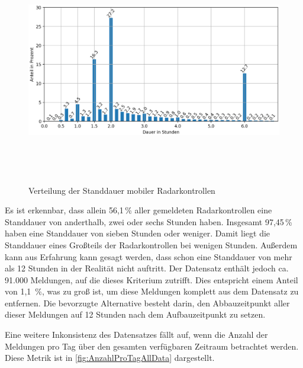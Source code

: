 \begin{figure}[h]
    \centering
    \includegraphics[width=1.0\textwidth,height=10cm,keepaspectratio=true]{content/images/Standdauer.png}
    \caption{Verteilung der Standdauer mobiler Radarkontrollen}
    \label{fig:StanddauerVerteilung}
\end{figure}

Es ist erkennbar, dass allein 56,1\,\% aller gemeldeten Radarkontrollen eine Standdauer von anderthalb, zwei oder sechs Stunden haben.
Insgesamt 97,45\,\% haben eine Standdauer von sieben Stunden oder weniger.
Damit liegt die Standdauer eines Großteils der Radarkontrollen bei wenigen Stunden.
Außerdem kann aus Erfahrung kann gesagt werden, dass schon eine Standdauer von mehr als 12 Stunden in der Realität nicht auftritt.
Der Datensatz enthält jedoch ca. 91.000 Meldungen, auf die dieses Kriterium zutrifft.
Dies entspricht einem Anteil von 1,1 \,\%, was zu groß ist, um diese Meldungen komplett aus dem Datensatz zu entfernen.
Die bevorzugte Alternative besteht darin, den Abbauzeitpunkt aller dieser Meldungen auf 12 Stunden nach dem Aufbauzeitpunkt zu setzen.

Eine weitere Inkonsistenz des Datensatzes fällt auf, wenn die Anzahl der Meldungen pro Tag über den gesamten verfügbaren Zeitraum betrachtet werden.
Diese Metrik ist in \autoref{fig:AnzahlProTagAllData} dargestellt.

